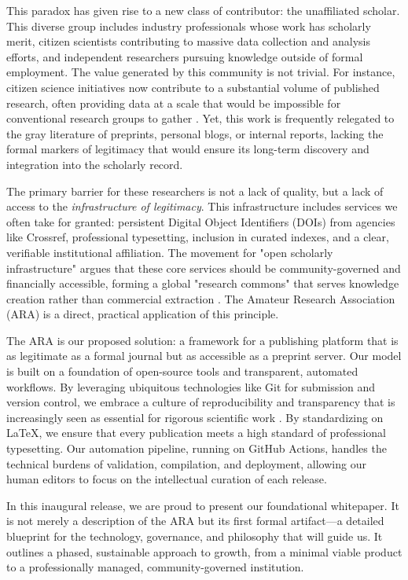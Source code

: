 \documentclass[conference, compsoc, 11pt]{IEEEtran}
\begin{document}
This paradox has given rise to a new class of contributor: the unaffiliated scholar. This diverse group includes industry professionals whose work has scholarly merit, citizen scientists contributing to massive data collection and analysis efforts, and independent researchers pursuing knowledge outside of formal employment. The value generated by this community is not trivial. For instance, citizen science initiatives now contribute to a substantial volume of published research, often providing data at a scale that would be impossible for conventional research groups to gather \cite{theobald2015}. Yet, this work is frequently relegated to the gray literature of preprints, personal blogs, or internal reports, lacking the formal markers of legitimacy that would ensure its long-term discovery and integration into the scholarly record.

The primary barrier for these researchers is not a lack of quality, but a lack of access to the \textit{infrastructure of legitimacy}. This infrastructure includes services we often take for granted: persistent Digital Object Identifiers (DOIs) from agencies like Crossref, professional typesetting, inclusion in curated indexes, and a clear, verifiable institutional affiliation. The movement for "open scholarly infrastructure" argues that these core services should be community-governed and financially accessible, forming a global "research commons" that serves knowledge creation rather than commercial extraction \cite{bilder2015}. The Amateur Research Association (ARA) is a direct, practical application of this principle.

The ARA is our proposed solution: a framework for a publishing platform that is as legitimate as a formal journal but as accessible as a preprint server. Our model is built on a foundation of open-source tools and transparent, automated workflows. By leveraging ubiquitous technologies like Git for submission and version control, we embrace a culture of reproducibility and transparency that is increasingly seen as essential for rigorous scientific work \cite{noble2009}. By standardizing on LaTeX, we ensure that every publication meets a high standard of professional typesetting. Our automation pipeline, running on GitHub Actions, handles the technical burdens of validation, compilation, and deployment, allowing our human editors to focus on the intellectual curation of each release.

In this inaugural release, we are proud to present our foundational whitepaper. It is not merely a description of the ARA but its first formal artifact—a detailed blueprint for the technology, governance, and philosophy that will guide us. It outlines a phased, sustainable approach to growth, from a minimal viable product to a professionally managed, community-governed institution.
\end{document}
